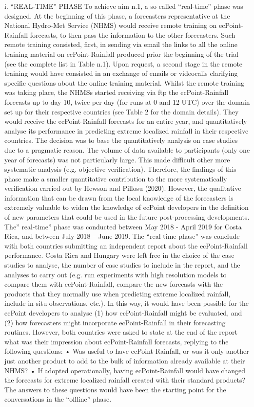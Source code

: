 \documentclass[twocol]{ametsocV5} %
\begin{document}
i.	“REAL-TIME” PHASE
To achieve aim n.1, a so called “real-time” phase was designed. At the beginning of this phase, a forecasters representative at the National Hydro-Met Service (NHMS) would receive remote training on ecPoint-Rainfall forecasts, to then pass the information to the other forecasters. Such remote training consisted, first, in sending via email the links to all the online training material on ecPoint-Rainfall produced prior the beginning of the trial (see the complete list in Table n.1). Upon request, a second stage in the remote training would have consisted in an exchange of emails or videocalls clarifying specific questions about the online training material. 
Whilst the remote training was taking place, the NHMSs started receiving via ftp the ecPoint-Rainfall forecasts up to day 10, twice per day (for runs at 0 and 12 UTC) over the domain set up for their respective countries (see Table 2 for the domain details). They would receive the ecPoint-Rainfall forecasts for an entire year, and quantitatively analyse its performance in predicting extreme localized rainfall in their respective countries. The decision was to base the quantitatively analysis on case studies due to a pragmatic reason. The volume of data available to participants (only one year of forecasts) was not particularly large. This made difficult other more systematic analysis (e.g. objective verification). Therefore, the findings of this phase make a smaller quantitative contribution to the more systematically verification carried out by Hewson and Pillosu (2020). However, the qualitative information that can be drawn from the local knowledge of the forecasters is extremely valuable to widen the knowledge of ecPoint developers in the definition of new parameters that could be used in the future post-processing developments.
The” real-time” phase was conducted between May 2018 - April 2019 for Costa Rica, and between July 2018 – June 2019. The “real-time phase” was conclude with both countries submitting an independent report about the ecPoint-Rainfall performance. Costa Rica and Hungary were left free in the choice of the case studies to analyse, the number of case studies to include in the report, and the analyses to carry out (e.g. run experiments with high resolution models to compare them with ecPoint-Rainfall, compare the new forecasts with the products that they normally use when predicting extreme localized rainfall, include in-situ observations, etc.). In this way, it would have been possible for the ecPoint developers to analyse (1) how ecPoint-Rainfall might be evaluated, and (2) how forecasters might incorporate ecPoint-Rainfall in their forecasting routines. However, both countries were asked to state at the end of the report what was their impression about ecPoint-Rainfall forecasts, replying to the following questions:
•	Was useful to have ecPoint-Rainfall, or was it only another just another product to add to the bulk of information already available at their NHMS? 
•	If adopted operationally, having ecPoint-Rainfall would have changed the forecasts for extreme localized rainfall created with their standard products?
The answers to these questions would have been the starting point for the conversations in the “offline” phase. 
\end{document}
